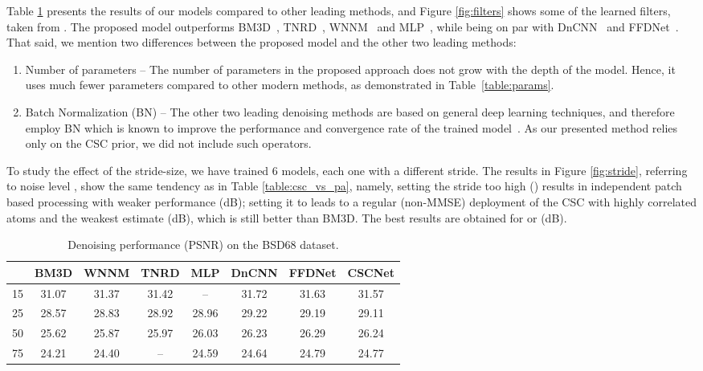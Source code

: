 \documentclass{article}
\begin{document}
Table \ref{table:csc-net_results} presents the results of our models compared to other leading methods, and Figure \ref{fig:filters} shows some of the learned filters, taken from . The proposed model outperforms BM3D~\cite{dabov2007image}, TNRD~\cite{chen2017trainable}, WNNM~\cite{gu2014weighted} and MLP~\cite{burger2012image}, while being on par with DnCNN~\cite{zhang2017beyond} and FFDNet~\cite{zhang2018ffdnet}. That said, we mention two differences between the proposed model and the other two leading methods:
\begin{enumerate}
	\item Number of parameters -- The number of parameters in the proposed approach does not grow with the depth of the model. Hence, it uses much fewer parameters compared to other modern methods, as demonstrated in Table~\ref{table:params}.
	\item Batch Normalization (BN) -- The other two leading denoising methods are based on general deep learning techniques, and therefore employ BN which is known to improve the performance and convergence rate of the trained model~\cite{ioffe2015batch}. As our presented method relies only on the CSC prior, we did not include such operators.
\end{enumerate}

To study the effect of the stride-size, we have trained 6 models, each one with a different stride. The results in Figure \ref{fig:stride}, referring to noise level , show the same tendency as in Table \ref{table:csc_vs_pa}, namely, setting the stride too high () results in independent patch based processing with weaker performance (dB); setting it to  leads to a regular (non-MMSE) deployment of the CSC with highly correlated atoms and the weakest estimate (dB), which is still better than BM3D. The best results are obtained for  or  (dB).

\begin{table}[t]
\centering
\caption{Denoising performance (PSNR) on the BSD68 dataset.\label{table:csc-net_results}}
\begin{tabular}{@{}cccccccc@{}}
\toprule
 & BM3D  & WNNM  & TNRD & MLP & DnCNN & FFDNet & CSCNet \\ \midrule
15       & 31.07 & 31.37 & 31.42 & --    & 31.72 & 31.63  & 31.57   \\
25       & 28.57 & 28.83 & 28.92 & 28.96 & 29.22 & 29.19  & 29.11   \\
50       & 25.62 & 25.87 & 25.97 & 26.03 & 26.23 & 26.29  & 26.24   \\
75       & 24.21 & 24.40 & --    & 24.59 & 24.64 & 24.79  & 24.77   \\ \bottomrule
\end{tabular}
\vspace{-3mm}
\end{table}
\end{document}
